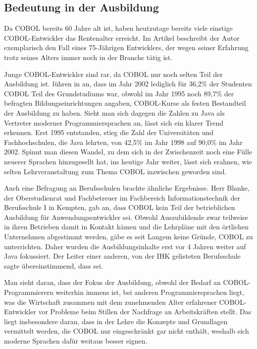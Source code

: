 \subsection*{Bedeutung in der Ausbildung}
Da COBOL bereits 60 Jahre alt ist, haben heutzutage bereits viele einstige COBOL-Entwickler das Rentenalter erreicht. Im Artikel  beschreibt der Autor exemplarisch den Fall eines 75-Jährigen Entwicklers, der wegen seiner Erfahrung trotz seines Alters immer noch in der Branche tätig ist.

Junge COBOL-Entwickler sind rar, da COBOL nur noch selten Teil der Ausbildung ist. \citeauthor{doke_cobol_2005} führen in  an, dass im Jahr 2002 lediglich für 36,2\% der Studenten COBOL Teil des Grundstudiums war, obwohl im Jahr 1995 noch 89,7\% der befragten Bildungseinrichtungen angaben, COBOL-Kurse als festen Bestandteil der Ausbildung zu haben. Sieht man sich dagegen die Zahlen zu Java als Vertreter moderner Programmiersprachen an, lässt sich ein klarer Trend erkennen. Erst 1995 entstanden, stieg die Zahl der Universitäten und Fachhochschulen, die Java lehrten, von 42,5\% im Jahr 1998 auf 90,0\% im Jahr 2002. Spinnt man diesen Wandel, zu dem sich in der Zwischenzeit noch eine Fülle neuerer Sprachen hinzugesellt hat, ins heutige Jahr weiter, lässt sich erahnen, wie selten Lehrveranstaltung zum Thema COBOL inzwischen geworden sind.

Auch eine Befragung an Berufsschulen brachte ähnliche Ergebnisse. Herr Blanke, der Oberstudienrat und Fachbetreuer im Fachbereich Informationstechnik der Berufsschule I in Kempten, gab an, dass COBOL kein Teil der betrieblichen Ausbildung für Anwendungsentwickler sei.  Obwohl Auszubildende zwar teilweise in ihren Betrieben damit in Kontakt kämen und die Lehrpläne mit den örtlichen Unternehmen abgestimmt werden, gäbe es seit Langem keine Gründe, COBOL zu unterrichten. Daher wurden die Ausbildungsinhalte erst vor 4 Jahren weiter auf Java fokussiert. Der Leiter einer anderen, von der IHK gelisteten Berufsschule sagte übereinstimmend, dass  sei.

Man sieht daran, dass der Fokus der Ausbildung, obwohl der Bedarf an COBOL-Programmierern weiterhin immens ist, bei anderen Programmiersprachen liegt, was die Wirtschaft zusammen mit dem zunehmenden Alter erfahrener COBOL-Entwickler vor Probleme beim Stillen der Nachfrage an Arbeitskräften stellt. Das liegt insbesondere daran, dass in der Lehre die Konzepte und Grundlagen vermittelt werden, die COBOL nur eingeschränkt \bzw gar nicht enthält, weshalb sich moderne Sprachen dafür weitaus besser eignen.

